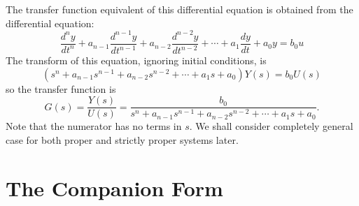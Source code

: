The transfer function equivalent of this differential equation is
obtained from the differential equation:
\[
\frac{d^{n}y}{dt^{n}} +
a_{n-1}\frac{d^{n-1}y}{dt^{n-1}}+a_{n-2}\frac{d^{n-2}y}{dt^{n-2}}+\cdots+a_1\frac{dy}{dt}+a_0
y = b_0 u
\]
The transform of this equation, ignoring initial conditions, is
\[
\left(s^n +
a_{n-1}s^{n-1}+a_{n-2}s^{n-2}+\cdots+a_1s+a_0\right)Y(s) = b_0
U(s)
\]
so the transfer function is
\[
G(s) = \frac{Y(s)}{U(s)} = \frac{b_0}{s^n +
a_{n-1}s^{n-1}+a_{n-2}s^{n-2}+\cdots+a_1s+a_0}.
\]
Note that the numerator has no terms in $s$. We shall consider
completely general case for both proper and strictly proper
systems later.

\section*{The Companion Form}


